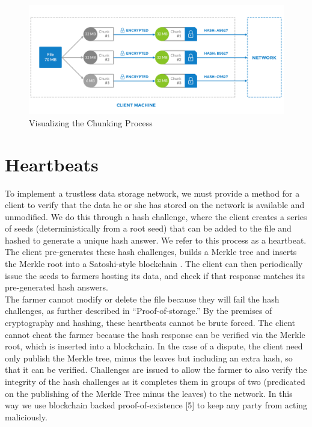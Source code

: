 \documentclass[a4paper,10pt]{article}
\begin{document}
\begin{figure}[h!]
\centering
\includegraphics[width=\linewidth]{1}
\caption{Visualizing the Chunking Process}
\end{figure}

\section{Heartbeats}
To implement a trustless data storage network, we must provide a method for a client to verify that the data he or she has stored on the network is available and unmodified. We do this through a hash challenge, where the client creates a series of seeds (deterministically from a root seed) that can be added to the file and hashed to generate a unique hash answer. We refer to this process as a heartbeat. The client pre-generates these hash challenges, builds a Merkle tree \cite{2} and inserts the Merkle root into a Satoshi-style blockchain \cite{3}. The client can then periodically issue the seeds to farmers hosting its data, and check if that response matches its pre-generated hash answers.\\

The farmer cannot modify or delete the file because they will fail the hash challenges, as further described in “Proof-of-storage.”  By the premises of cryptography and hashing, these heartbeats cannot be brute forced. The client cannot cheat the farmer because the hash response can be verified via the Merkle root, which is inserted into a blockchain. In the case of a dispute, the client need only publish the Merkle tree, minus the leaves but including an extra hash, so that it can be verified. Challenges are issued to allow the farmer to also verify the integrity of the hash challenges as it completes them in groups of two (predicated on the publishing of the Merkle Tree minus the leaves) to the network. In this way we use blockchain backed proof-of-existence \cite{4} [5] to keep any party from acting maliciously.  \\
\end{document}

